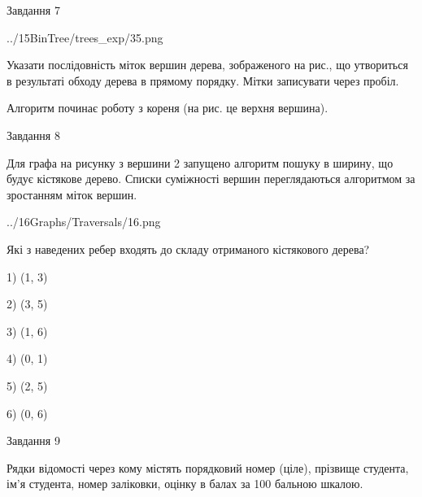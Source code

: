 \documentclass[12pt, ukrainian]{article}
\begin{document}
{\vspace{10mm}\par

\newpage
\begin{minipage}[t]{9.7cm}
               
{\begin{center}Завдання {7}\end{center}}
\vspace{-4mm}

\begin{center}
	{../15BinTree/trees_exp/35.png}
\end{center}
Указати послідовність міток вершин дерева, зображеного на рис., що утвориться в результаті обходу дерева в прямому порядку. Мітки записувати через пробіл.\par Алгоритм починає роботу з кореня (на рис. це верхня вершина).\par

\end{minipage}
\vline \hspace{8mm}
\begin{minipage}[t]{8.0cm}
               
{\begin{center}Завдання {8}\end{center}}
\vspace{-4mm}
Для графа на рисунку з вершини 2 запущено алгоритм пошуку в ширину, що будує кістякове дерево. Списки суміжності вершин переглядаються алгоритмом за зростанням міток вершин.\par
\begin{center}
	{../16Graphs/Traversals/16.png}
\end{center}
\par Які з наведених ребер входять до складу отриманого кістякового дерева?\par
1) (1, 3)\par
2) (3, 5)\par
3) (1, 6)\par
4) (0, 1)\par
5) (2, 5)\par
6) (0, 6)\par
{\vskip 15pt} \par

\end{minipage}

               
{\begin{center}Завдання {9}\end{center}}
\vspace{-4mm}
Рядки відомості через кому містять порядковий номер (ціле), пріз\-ви\-ще студен\-та, ім'я студента, номер заліковки, оцінку в балах за 100 бальною шкалою.

}
\end{document}
